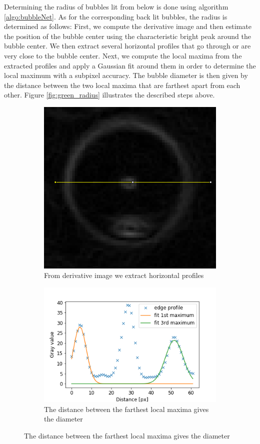 			
			Determining the radius of bubbles lit from below is done using algorithm \ref{algo:bubbleNet}. As for the corresponding back lit bubbles, the radius is determined as follows:
			First, we compute the derivative image and then estimate the position of the bubble center using the characteristic bright peak around the bubble center. We then extract several horizontal profiles that go through or are very close to the bubble center. Next, we compute the local maxima from the extracted profiles and apply a Gaussian fit around them in order to determine the local maximum with a subpixel accuracy. The bubble diameter is then given by the distance between the two local maxima that are farthest apart from each other. Figure \ref{fig:green_radius} illustrates the described steps above. 
			
			\begin{figure}
				\centering

				\begin{subfigure}[t]{.4\textwidth}
					\centering
					\includegraphics[scale=0.3]{images/green_edges.png}
					\caption{From derivative image we extract horizontal profiles}
				\end{subfigure}\hfill
				\begin{subfigure}[t]{.5\textwidth}
					\centering
					\includegraphics[scale=.6]{graphs/green_radius_demo.png}
					\caption{The distance between the farthest local maxima gives the diameter}
				\end{subfigure}
				

\end{figure}
